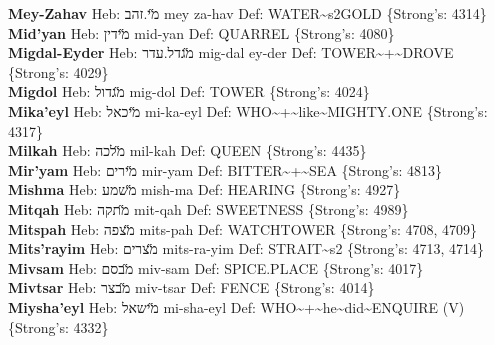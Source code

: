 {\textbf{Mey-Zahav} Heb: {\large\H מי.זהב} mey za-hav Def: WATER\textasciitilde{}s2GOLD \{Strong's: 4314\}\hfill{}\\

\textbf{Mid'yan} Heb: {\large\H מידין} mid-yan Def: QUARREL \{Strong's: 4080\}\hfill{}\\

\textbf{Migdal-Eyder} Heb: {\large\H מגדל.עדר} mig-dal ey-der Def: TOWER\textasciitilde{}+\textasciitilde{}DROVE \{Strong's: 4029\}\hfill{}\\

\textbf{Migdol} Heb: {\large\H מגדול} mig-dol Def: TOWER \{Strong's: 4024\}\hfill{}\\

\textbf{Mika'eyl} Heb: {\large\H מיכאל} mi-ka-eyl Def: WHO\textasciitilde{}+\textasciitilde{}like\textasciitilde{}MIGHTY.ONE \{Strong's: 4317\}\hfill{}\\

\textbf{Milkah} Heb: {\large\H מלכה} mil-kah Def: QUEEN \{Strong's: 4435\}\hfill{}\\

\textbf{Mir'yam} Heb: {\large\H מירים} mir-yam Def: BITTER\textasciitilde{}+\textasciitilde{}SEA \{Strong's: 4813\}\hfill{}\\

\textbf{Mishma} Heb: {\large\H משמע} mish-ma Def: HEARING \{Strong's: 4927\}\hfill{}\\

\textbf{Mitqah} Heb: {\large\H מתקה} mit-qah Def: SWEETNESS \{Strong's: 4989\}\hfill{}\\

\textbf{Mitspah} Heb: {\large\H מצפה} mits-pah Def: WATCHTOWER \{Strong's: 4708, 4709\}\hfill{}\\

\textbf{Mits'rayim} Heb: {\large\H מצרים} mits-ra-yim Def: STRAIT\textasciitilde{}s2 \{Strong's: 4713, 4714\}\hfill{}\\

\textbf{Mivsam} Heb: {\large\H מבסם} miv-sam Def: SPICE.PLACE \{Strong's: 4017\}\hfill{}\\

\textbf{Mivtsar} Heb: {\large\H מבצר} miv-tsar Def: FENCE \{Strong's: 4014\}\hfill{}\\

\textbf{Miysha'eyl} Heb: {\large\H מישאל} mi-sha-eyl Def: WHO\textasciitilde{}+\textasciitilde{}he\textasciitilde{}did\textasciitilde{}ENQUIRE (V) \{Strong's: 4332\}\hfill{}\\

}
